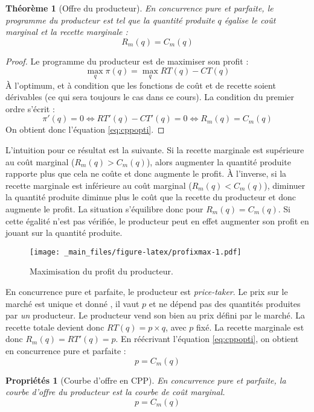 \documentclass[
  a4paper,
]{book}
\newtheorem{theorem}{Théorème}[chapter]
\newtheorem{proposition}{Propriétés}[chapter]
\theoremstyle{definition}
\theoremstyle{definition}
\theoremstyle{definition}
\theoremstyle{definition}
\theoremstyle{remark}
\begin{document}
\begin{theorem}[Offre du producteur]
En concurrence pure et parfaite, le programme du producteur est tel que la quantité produite \(q\) égalise le coût marginal et la recette marginale :
\begin{equation}
R_m(q) =C_m(q)
\label{eq:cppopti}
\end{equation}
\end{theorem}

\begin{proof}
Le programme du producteur est de maximiser son profit :
\[\max_q\pi(q)=\max_q RT(q)-CT(q)\]
À l'optimum, et à condition que les fonctions de coût et de recette soient dérivables (ce qui sera toujours le cas dans ce cours). La condition du premier ordre s'écrit :
\[\pi'(q)=0\Leftrightarrow RT'(q)-CT'(q)=0\Leftrightarrow R_m(q)=C_m(q)\]
On obtient donc l'équation \eqref{eq:cppopti}.
\end{proof}

L'intuition pour ce résultat est la suivante.
Si la recette marginale est supérieure au coût marginal (\(R_m(q)>C_m(q)\)), alors augmenter la quantité produite rapporte plus que cela ne coûte et donc augmente le profit.
À l'inverse, si la recette marginale est inférieure au coût marginal (\(R_m(q)<C_m(q)\)), diminuer la quantité produite diminue plus le coût que la recette du producteur et donc augmente le profit.
La situation s'équilibre donc pour \(R_m(q)=C_m(q)\).
Si cette égalité n'est pas vérifiée, le producteur peut en effet augmenter son profit en jouant sur la quantité produite.

\begin{figure}
\centering
\texttt{[image: \_main\_files/figure-latex/profixmax-1.pdf]}
\caption{\label{fig:profixmax}Maximisation du profit du producteur.}
\end{figure}

En concurrence pure et parfaite, le producteur est \emph{price-taker}.
Le prix sur le marché est unique et donné , il vaut \(p\) et ne dépend pas des quantités produites par \emph{un} producteur.
Le producteur vend son bien au prix défini par le marché.
La recette totale devient donc \(RT(q)=p\times q\), avec \(p\) fixé.
La recette marginale est donc \(R_m(q)=RT'(q)=p\).
En réécrivant l'équation \eqref{eq:cppopti}, on obtient en concurrence pure et parfaite :
\[p=C_m(q)\]

\begin{proposition}[Courbe d'offre en CPP]
En concurrence pure et parfaite, la courbe d'offre du producteur est la courbe de coût marginal.
\[p=C_m(q)\]
\end{proposition}
\end{document}
